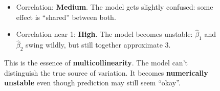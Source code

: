 \begin{figure}[!htp]
{\begin{itemize}
        \item[\textcolor{Orange3}{\faIcon{balance-scale}}] Correlation: \textcolor{Orange3}{\textbf{Medium}}. The model gets slightly confused: some effect is ``shared'' between both.

        \item[\textcolor{Red2}{\faIcon{exclamation-triangle}}] Correlation near 1: \textcolor{Red2}{\textbf{High}}. The model becomes unstable: $\hat{\beta}_1$ and $\hat{\beta}_2$ swing wildly, but still together approximate 3.
    \end{itemize}
    This is the essence of \textbf{multicollinearity}. The model can't distinguish the true source of variation. It becomes \textbf{numerically unstable} even though prediction may still seem ``okay''.}
\end{figure}